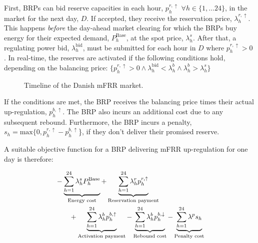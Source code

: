 First, BRPs can bid reserve capacities in each hour, $p_{h}^{r,\uparrow}$ $\forall{h} \in \{1, \ldots 24 \}$, in the market for the next day, $D$. If accepted, they receive the reservation price, $\lambda_{h}^{r,\uparrow}$. This happens \textit{before} the day-ahead market clearing for which the BRPs buy energy for their expected demand, $P_{h}^{\text{Base}}$, at the spot price, $\lambda_{h}^{s}$. After that, a regulating power bid, $\lambda_{h}^{\text{bid}}$, must be submitted for each hour in $D$ where $p_{h}^{r,\uparrow} > 0$ \cite{energinet:Systemydelser}. In real-time, the reserves are activated if the following conditions hold, depending on the balancing price: $\{p_{h}^{r,\uparrow} > 0 \land \lambda_{h}^{\text{bid}} <  \lambda_{h}^{b} \land \lambda_{h}^{b} > \lambda_{h}^{s} \}$



\begin{figure}[!t]
    \centering
    
    \caption{Timeline of the Danish mFRR market.}
    \label{fig:timeline_mfrr}
\end{figure}


If the conditions are met, the BRP receives the balancing price times their actual up-regulation, $p_{h}^{b,\uparrow}$. The BRP also incurs an additional cost due to any subsequent rebound. Furthermore, the BRP incurs a penalty, $s_{h} = \text{max}\{0, p_{h}^{r,\uparrow} - p_{h}^{b,\uparrow}$\}, if they don't deliver their promised reserve.

A suitable objective function for a BRP delivering mFRR up-regulation for one day is therefore:

\begin{align}\label{eq:mFRRObjective}
     &  - \underbrace{\sum_{h=1}^{24} \lambda^{s}_{h}P^{\text{Base}}_{h}}_{\textrm{Energy cost}} + \underbrace{\sum_{h=1}^{24}\lambda_{h}^{r} p^{r, \uparrow}_{h}}_{\textrm{Reservation payment}}  \notag \\ & \quad \quad + \underbrace{\sum_{h=1}^{24}  \lambda_{h}^{b} p^{b,\uparrow}_{h}}_{\textrm{Activation payment}} - \underbrace{\sum_{h=1}^{24}  \lambda_{h}^{b} p^{b,\downarrow}_{h}}_{\textrm{Rebound cost}} - \underbrace{ \sum_{h=1}^{24}  \lambda^{p}s_{h}}_{\textrm{Penalty cost}}
\end{align}


